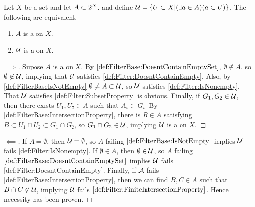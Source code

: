 \begin{prop}
    \label{prop:FilterBase}
    Let $X$ be a set and let 
    $A \subset 2^{X}$. 
    and define 
    $\mathcal{U}=\{U \subset X | (\exists a \in A ) ( a \subset U ) \}$. 
    The following are equivalent. 
    \begin{enumerate}
    \item $A$ is a \FilterBase on $X$. 
    \item $\mathcal{U}$ is a \Filter on $X$. 
    \end{enumerate}
    \begin{proof}[$\implies$]
    Supose $A$ is a \FilterBase on $X$.
    By $\ref{def:FilterBase:DoesntContainEmptySet}$, $\emptyset \not \in A$, so 
    $\emptyset \not \in \mathcal{U}$, implying that $\mathcal{U}$ satisfies
    \ref{def:Filter:DoesntContainEmpty}. 
    Also, by \ref{def:FilterBaseIsNotEmpty} $\emptyset \neq A \subset \mathcal{U}$, so $\mathcal{U}$ satisfies
    \ref{def:Filter:IsNonempty}. That $\mathcal{U}$ satisfies \ref{def:Filter:SubsetProperty} is obvious. 
    Finally, if $G_1,G_2 \in \mathcal{U}$, then there exists $U_1,U_2 \in A$ such that $A_i \subset G_i$. 
    By \ref{def:FilterBase:IntersectionProperty}, there is $B \in A$ satisfying 
    $B \subset U_1 \cap U_2 \subset G_1 \cap G_2$, so $G_1 \cap G_2 \in \mathcal{U}$, implying $\mathcal{U}$ is a \Filter on $X$. 
    \end{proof}
    \begin{proof}[$\impliedby$]
        If $A = \emptyset$, then $\mathcal{U}=\emptyset$, so $A$ failing $\ref{def:FilterBase:IsNotEmpty}$ implies $\mathcal{U}$ fails \ref{def:Filter:IsNonempty}. 
        If $\emptyset \in A$, then $\emptyset \in \mathcal{U}$, so $A$ failing $\ref{def:FilterBase:DoesntContainEmptySet}$ implies $\mathcal{U}$ fails \ref{def:Filter:DoesntContainEmpty}. 
        Finally, if $\mathcal{A}$ fails \ref{def:FilterBase:IntersectionProperty}, then 
        we can find $B,C \in A$ such that $B \cap C \not \in \mathcal{U}$, implying $\mathcal{U}$ fails $\ref{def:Filter:FiniteIntersectionProperty}$. 
        Hence necessity has been proven. 
    \end{proof}
\end{prop}
